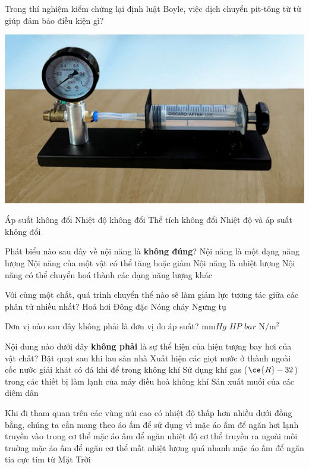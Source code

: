 \begin{ex}
	Trong thí nghiệm kiểm chứng lại định luật Boyle, việc dịch chuyển pit-tông từ từ giúp đảm bảo điều kiện gì?
	\begin{center}
		\includegraphics[width=0.3\linewidth]{../figs/D12-2-5}
	\end{center}
	\choice
	{Áp suất không đổi}
	{\True Nhiệt độ không đổi}
	{Thể tích không đổi}
	{Nhiệt độ và áp suất không đổi}
	\loigiai{}
\end{ex}
\begin{ex}
	Phát biểu nào sau đây về nội năng là \textbf{không đúng}?
	\choice
	{Nội năng là một dạng năng lượng}
	{Nội năng của một vật có thể tăng hoặc giảm}
	{\True Nội năng là nhiệt lượng}
	{Nội năng có thể chuyển hoá thành các dạng năng lượng khác}
	\loigiai{}
\end{ex}
\begin{ex}
	Với cùng một chất, quá trình chuyển thể nào sẽ làm giảm lực tương tác giữa các phân tử nhiều nhất?
	\choice
	{\True Hoá hơi}
	{Đông đặc}
	{Nóng chảy}
	{Ngưng tụ}
	\loigiai{}
\end{ex}
\begin{ex}
	Đơn vị nào sau đây không phải là đơn vị đo áp suất?
	\choice
	{$\si{\milli\meter Hg}$}
	{\True $\si{HP}$}
	{$\si{bar}$}
	{$\si{\newton/\meter^2}$}
	\loigiai{}
\end{ex}
\begin{ex}
	Nội dung nào dưới đây \textbf{không phải} là sự thể hiện của hiện tượng bay hơi của vật chất?
	\choice
	{Bật quạt sau khi lau sàn nhà}
	{\True Xuất hiện các giọt nước ở thành ngoài cốc nước giải khát có đá khi để trong không khí}
	{Sử dụng khí gas ($\ce{R}-32$) trong các thiết bị làm lạnh của máy điều hoà không khí}
	{Sản xuất muối của các diêm dân}
	\loigiai{}
\end{ex}
\begin{ex}
	Khi đi tham quan trên các vùng núi cao có nhiệt độ thấp hơn nhiều dưới đồng bằng, chúng ta cần mang theo áo ấm để sử dụng vì
	\choice
	{mặc áo ấm để ngăn hơi lạnh truyền vào trong cơ thể}
	{mặc áo ấm để ngăn nhiệt độ cơ thể truyền ra ngoài môi truờng}
	{\True mặc áo ấm để ngăn cơ thể mất nhiệt lượng quá nhanh}
	{mặc áo ấm để ngăn tia cực tím từ Mặt Trời}
	\loigiai{}
\end{ex}
